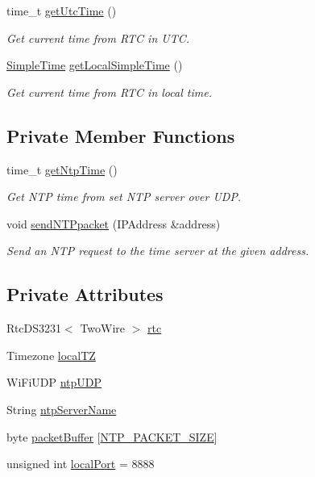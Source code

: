 \begin{DoxyCompactItemize}
time\+\_\+t \mbox{\hyperlink{class_clock_module_af0faab0171ded0fdb37dcbff757f451e}{get\+Utc\+Time}} ()
\begin{DoxyCompactList}\small\item\em Get current time from R\+TC in U\+TC. \end{DoxyCompactList}\item 
\mbox{\hyperlink{class_simple_time}{Simple\+Time}} \mbox{\hyperlink{class_clock_module_aa208cd29a002d60e4e5f064813acf9f3}{get\+Local\+Simple\+Time}} ()
\begin{DoxyCompactList}\small\item\em Get current time from R\+TC in local time. \end{DoxyCompactList}\end{DoxyCompactItemize}
\subsection*{Private Member Functions}
\begin{DoxyCompactItemize}
\item 
time\+\_\+t \mbox{\hyperlink{class_clock_module_a4e1dc771d7467c2bd5e9c7885231982e}{get\+Ntp\+Time}} ()
\begin{DoxyCompactList}\small\item\em Get N\+TP time from set N\+TP server over U\+DP. \end{DoxyCompactList}\item 
void \mbox{\hyperlink{class_clock_module_a266855ecf4aa1f466d1a3556caff008c}{send\+N\+T\+Ppacket}} (I\+P\+Address \&address)
\begin{DoxyCompactList}\small\item\em Send an N\+TP request to the time server at the given address. \end{DoxyCompactList}\end{DoxyCompactItemize}
\subsection*{Private Attributes}
\begin{DoxyCompactItemize}
\item 
Rtc\+D\+S3231$<$ Two\+Wire $>$ \mbox{\hyperlink{class_clock_module_a191d985f5169622e48f7babba844bd60}{rtc}}
\item 
Timezone \mbox{\hyperlink{class_clock_module_a6fc4d5d14eec707268959c3e482dae3e}{local\+TZ}}
\item 
Wi\+Fi\+U\+DP \mbox{\hyperlink{class_clock_module_ac6af65f52509d43d767fde9e307f5118}{ntp\+U\+DP}}
\item 
String \mbox{\hyperlink{class_clock_module_ae8b741cfeb6577eee023e28359acca0f}{ntp\+Server\+Name}}
\item 
byte \mbox{\hyperlink{class_clock_module_a51e755c2014a01ab68c58c1bcbea5184}{packet\+Buffer}} \mbox{[}\mbox{\hyperlink{class_clock_module_ab12ec0e0e1a0a02861feae0272840cff}{N\+T\+P\+\_\+\+P\+A\+C\+K\+E\+T\+\_\+\+S\+I\+ZE}}\mbox{]}
\item 
unsigned int \mbox{\hyperlink{class_clock_module_a0ea28a7086d25b525ae2ae7e8ac05004}{local\+Port}} = 8888
\end{DoxyCompactItemize}

